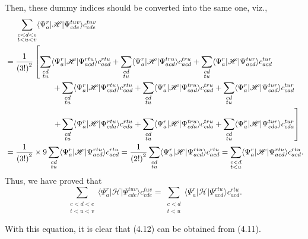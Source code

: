 \documentclass[a4paper]{book}
\begin{document}
\begin{solution}
	Then, these dummy indices should be converted into the same one, viz.,
	\begin{align*}
		&\hspace{1.4em} \sum_{ \substack{ c<d<e \\ t<u<v } } \langle \Psi^r_a | \mathscr{H} | \Psi^{tuv}_{cde} \rangle c^{tuv}_{cde} \\
		&= \frac{1}{\left(3!\right)^2}  \left[ \sum_{ \substack{ cd \\ tu } } \langle \Psi^r_a | \mathscr{H} | \Psi^{rtu}_{acd} \rangle c^{rtu}_{acd} + \sum_{ \substack{ cd \\ tu } } \langle \Psi^r_a | \mathscr{H} | \Psi^{tru}_{acd} \rangle c^{tru}_{acd} + \sum_{ \substack{ cd \\ tu } } \langle \Psi^r_a | \mathscr{H} | \Psi^{tur}_{acd} \rangle c^{tur}_{acd} \right. \\
		&\hspace{ 6em } + \sum_{ \substack{ cd \\ tu } } \langle \Psi^r_a | \mathscr{H} | \Psi^{rtu}_{cad} \rangle c^{rtu}_{cad} + \sum_{ \substack{ cd \\ tu } } \langle \Psi^r_a | \mathscr{H} | \Psi^{tru}_{cad} \rangle c^{tru}_{cad} + \sum_{ \substack{ cd \\ tu } } \langle \Psi^r_a | \mathscr{H} | \Psi^{tur}_{cad} \rangle c^{tur}_{cad} \\
		&\hspace{ 6em } \left. + \sum_{ \substack{ cd \\ tu } } \langle \Psi^r_a | \mathscr{H} | \Psi^{rtu}_{cda} \rangle c^{rtu}_{cda} + \sum_{ \substack{ cd \\ tu } } \langle \Psi^r_a | \mathscr{H} | \Psi^{tru}_{cda} \rangle c^{tru}_{cda} + \sum_{ \substack{ cd \\ tu } } \langle \Psi^r_a | \mathscr{H} | \Psi^{tur}_{cda} \rangle c^{tur}_{cda} \right] \\
		&= \frac{1}{\left(3!\right)^2} \times 9 \sum_{ \substack{ cd \\ tu } } \langle \Psi^r_a | \mathscr{H} | \Psi^{rtu}_{acd} \rangle c^{rtu}_{acd} = \frac{1}{\left(2!\right)^2} \sum_{ \substack{ cd \\ tu } } \langle \Psi^r_a | \mathscr{H} | \Psi^{rtu}_{acd} \rangle c^{rtu}_{acd} = \sum_{ \substack{ c<d \\ t<u } } \langle \Psi^r_a | \mathscr{H} | \Psi^{rtu}_{acd} \rangle c^{rtu}_{acd}.
	\end{align*}
	Thus, we have proved that
	\begin{equation}
		\sum_{ \substack{ c<d<e \\ t<u<v } } \langle \Psi^r_a | \mathscr{H} | \Psi^{tuv}_{cde} \rangle c^{tuv}_{cde} = \sum_{ \substack{ c<d \\ t<u } } \langle \Psi^r_a | \mathscr{H} | \Psi^{rtu}_{acd} \rangle c^{rtu}_{acd}.
	\end{equation}
	
	With this equation, it is clear that (4.12) can be obtained from (4.11).
	
	\end{solution}
	
\end{document}
